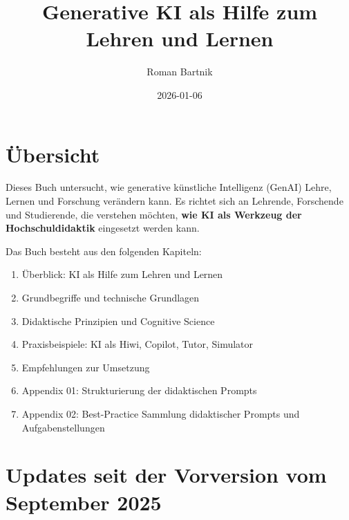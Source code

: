 \documentclass[
  ngerman,
  letterpaper,
  DIV=11]{scrreprt}
\title{Generative KI als Hilfe zum Lehren und Lernen}
\author{Roman Bartnik}
\date{2026-01-06}
\providecommand{\tightlist}{%
  \setlength{\itemsep}{0pt}\setlength{\parskip}{0pt}}
\renewcommand*\contentsname{Inhaltsverzeichnis}
\newcommand\contentsname{Inhaltsverzeichnis}
\begin{document}
\maketitle

\renewcommand*\contentsname{Inhaltsverzeichnis}
{
\hypersetup{linkcolor=}
\setcounter{tocdepth}{2}
\tableofcontents
}


\chapter*{Übersicht}\label{uxfcbersicht}


Dieses Buch untersucht, wie generative künstliche Intelligenz (GenAI)
Lehre, Lernen und Forschung verändern kann. Es richtet sich an Lehrende,
Forschende und Studierende, die verstehen möchten, \textbf{wie KI als
Werkzeug der Hochschuldidaktik} eingesetzt werden kann.

Das Buch besteht aus den folgenden Kapiteln:

\begin{enumerate}
\def\labelenumi{\arabic{enumi}.}
\tightlist
\item
  Überblick: KI als Hilfe zum Lehren und Lernen\\
\item
  Grundbegriffe und technische Grundlagen\\
\item
  Didaktische Prinzipien und Cognitive Science\\
\item
  Praxisbeispiele: KI als Hiwi, Copilot, Tutor, Simulator\\
\item
  Empfehlungen zur Umsetzung\\
\item
  Appendix 01: Strukturierung der didaktischen Prompts\\
\item
  Appendix 02: Best-Practice Sammlung didaktischer Prompts und
  Aufgabenstellungen\\
\end{enumerate}


\chapter*{Updates seit der Vorversion vom September
2025}\label{updates-seit-der-vorversion-vom-september-2025}
\end{document}
